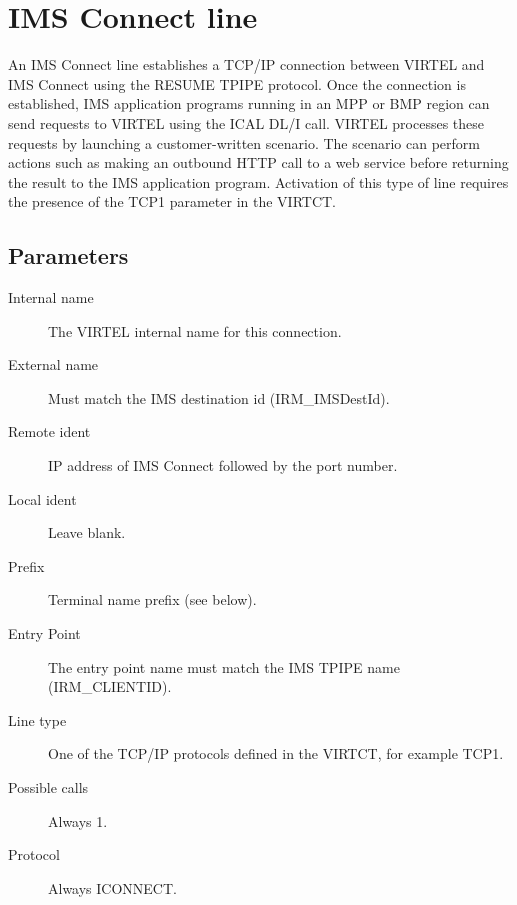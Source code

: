 \documentclass[letterpaper,10pt,english]{sphinxmanual}
\begin{document}
\newpage

\ignorespaces 

\section{IMS Connect line}
\label{\detokenize{connectivity_guide:ims-connect-line}}\label{\detokenize{connectivity_guide:index-22}}
An IMS Connect line establishes a TCP/IP connection between VIRTEL and IMS Connect using the RESUME TPIPE protocol. Once the connection is established, IMS application programs running in an MPP or BMP region can send requests to VIRTEL using the ICAL DL/I call. VIRTEL processes these requests by launching a customer-written scenario. The scenario can perform actions such as making an outbound HTTP call to a web service before returning the result to the IMS application program. Activation of this type of line requires the presence of the TCP1 parameter in the VIRTCT.



\subsection{Parameters}
\label{\detokenize{connectivity_guide:id7}}\begin{description}
\item[{Internal name}] \leavevmode
The VIRTEL internal name for this connection.

\item[{External name}] \leavevmode
Must match the IMS destination id (IRM\_IMSDestId).

\item[{Remote ident}] \leavevmode
IP address of IMS Connect followed by the port number.

\item[{Local ident}] \leavevmode
Leave blank.

\item[{Prefix}] \leavevmode
Terminal name prefix (see below).

\item[{Entry Point}] \leavevmode
The entry point name must match the IMS TPIPE name (IRM\_CLIENTID).

\item[{Line type}] \leavevmode
One of the TCP/IP protocols defined in the VIRTCT, for example TCP1.

\item[{Possible calls}] \leavevmode
Always 1.

\item[{Protocol}] \leavevmode
Always ICONNECT.

\end{description}
\end{document}
